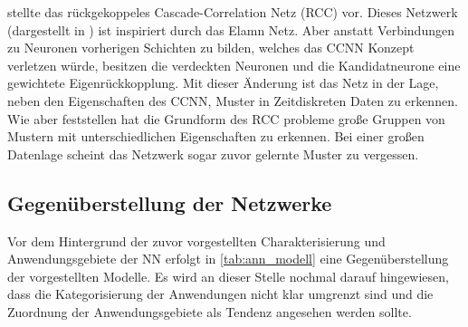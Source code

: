\citet{Fahlman1991} stellte das rückgekoppeles Cascade-Correlation Netz (RCC) vor. Dieses Netzwerk (dargestellt in ) ist inspiriert durch das Elamn Netz. Aber anstatt Verbindungen zu Neuronen vorherigen Schichten zu bilden, welches das CCNN Konzept verletzen würde, besitzen die verdeckten Neuronen und die Kandidatneurone eine gewichtete Eigenrückkopplung. Mit dieser Änderung ist das Netz in der Lage, neben den Eigenschaften des CCNN, Muster in Zeitdiskreten Daten zu erkennen. Wie aber \citet{Kirschninga1995} feststellen hat die Grundform des RCC probleme große Gruppen von Mustern mit unterschiedlichen Eigenschaften zu erkennen. Bei einer großen Datenlage scheint das Netzwerk sogar zuvor gelernte Muster zu vergessen.  




\subsection{Gegenüberstellung der Netzwerke}

Vor dem Hintergrund der zuvor vorgestellten Charakterisierung und Anwendungsgebiete der NN erfolgt in \autoref{tab:ann_modell} eine Gegenüberstellung der vorgestellten Modelle. Es wird an dieser Stelle nochmal darauf hingewiesen, dass die Kategorisierung der Anwendungen nicht klar umgrenzt sind und die Zuordnung der Anwendungsgebiete als Tendenz angesehen werden sollte.

